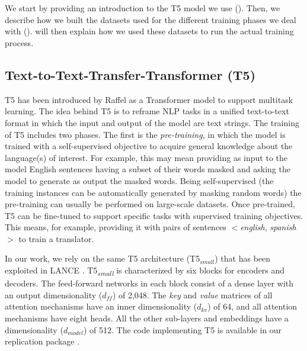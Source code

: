 \section{\approach} \label{sec:t5}

We start by providing an introduction to the T5 model we use (). Then, we describe how we built the datasets used for the different training phases we deal with ().   will then explain how we used these datasets to run the actual training process.


\subsection{Text-to-Text-Transfer-Transformer (T5)}
\label{sub:t5}
T5 has been introduced by Raffel \etal \cite{raffel2019exploring} as a Transformer \cite{vaswani2017attention} model to support multitask learning. The idea behind T5 is to reframe NLP tasks in a unified text-to-text format in which the input and output of the model are text strings. The training of T5 includes two phases. The first is the \textit{pre-training}, in which the model is trained with a self-supervised objective to acquire general knowledge about the language(s) of interest. For example, this may mean providing as input to the model English sentences having a subset of their words masked and asking the model to generate as output the masked words. Being self-supervised (\ie the training instances can be automatically generated by masking random words) the pre-training can usually be performed on large-scale datasets. Once pre-trained, T5 can be fine-tuned to support specific tasks with supervised training objectives. This means, for example, providing it with pairs of sentences $<$\emph{english}, \emph{spanish}$>$ to train a translator.

In our work, we rely on the same T5 architecture (\ie T5$_{small}$) that has been exploited in LANCE \cite{mastropaolo2022using}. T5\textsubscript{\textit{small}} is characterized by six blocks for encoders and decoders. The feed-forward networks in each block consist of a dense layer with an output dimensionality ($d_{ff}$) of 2,048. The \textit{key} and \textit{value} matrices of all attention mechanisms have an inner dimensionality ($d_{kv}$) of 64, and all attention mechanisms have eight heads. All the other sub-layers and embeddings have a dimensionality ($d_{model}$) of 512. The code implementing T5 is available in our replication package \cite{replication}.



